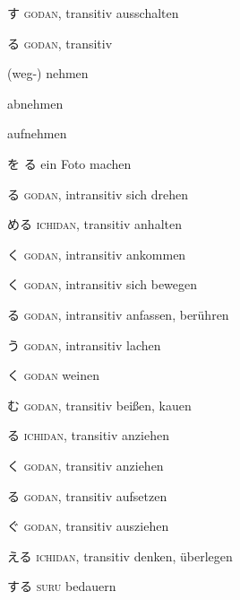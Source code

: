 \vocab
    {す}
    {\textsc{godan}, transitiv}
    {ausschalten}
    {}

\vocab
  {る}
  {\textsc{godan}, transitiv}
  {(weg-) nehmen
  \item {} abnehmen 
  \item {} aufnehmen }
  {\example
    { を る}
    {ein Foto machen}
  }

\vocab
  {る}
  {\textsc{godan}, intransitiv}
  {sich drehen}
  {}

\vocab
  {める}
  {\textsc{ichidan}, transitiv}
  {anhalten}
  {}

\vocab
  {く}
  {\textsc{godan}, intransitiv}
  {ankommen}
  {}

\vocab
  {く}
  {\textsc{godan}, intransitiv}
  {sich bewegen}
  {}

\vocab
  {る}
  {\textsc{godan}, intransitiv}
  {anfassen, berühren}
  {}

\vocab
  {う}
  {\textsc{godan}, intransitiv}
  {lachen}
  {}

\vocab
  {く}
  {\textsc{godan}}
  {weinen}
  {}

\vocab
  {む}
  {\textsc{godan}, transitiv}
  {beißen, kauen}
  {}

\vocab
  {る}
  {\textsc{ichidan}, transitiv}
  {anziehen }
  {}

\vocab
  {く}
  {\textsc{godan}, transitiv}
  {anziehen }
  {}

\vocab
  {る}
  {\textsc{godan}, transitiv}
  {aufsetzen }
  {}

\vocab
  {ぐ}
  {\textsc{godan}, transitiv}
  {ausziehen }
  {}

\vocab
  {える}
  {\textsc{ichidan}, transitiv}
  {denken, überlegen}
  {}

\vocab
  {する}
  {\textsc{suru}}
  {bedauern}
  {}
